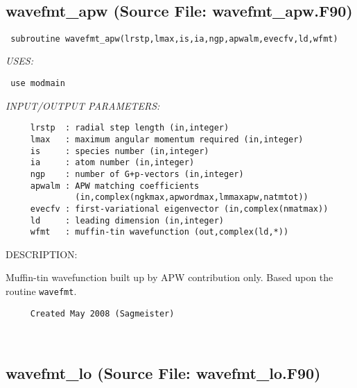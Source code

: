 \documentclass[11pt]{article}
\begin{document}



 
 
\mbox{}\hrulefill\ 
 
\subsection{wavefmt\_apw (Source File: wavefmt\_apw.F90)}


\begin{verbatim} subroutine wavefmt_apw(lrstp,lmax,is,ia,ngp,apwalm,evecfv,ld,wfmt)\end{verbatim}{\em USES:}
\begin{verbatim} use modmain\end{verbatim}{\em INPUT/OUTPUT PARAMETERS:}
\begin{verbatim}     lrstp  : radial step length (in,integer)
     lmax   : maximum angular momentum required (in,integer)
     is     : species number (in,integer)
     ia     : atom number (in,integer)
     ngp    : number of G+p-vectors (in,integer)
     apwalm : APW matching coefficients
              (in,complex(ngkmax,apwordmax,lmmaxapw,natmtot))
     evecfv : first-variational eigenvector (in,complex(nmatmax))
     ld     : leading dimension (in,integer)
     wfmt   : muffin-tin wavefunction (out,complex(ld,*))\end{verbatim}
{\sf DESCRIPTION:\\ }


     Muffin-tin wavefunction built up by APW contribution only.
     Based upon the routine {\tt wavefmt}.
  
\begin{verbatim}     Created May 2008 (Sagmeister)\end{verbatim}


 
 
\mbox{}\hrulefill\ 
 
\subsection{wavefmt\_lo (Source File: wavefmt\_lo.F90)}
\end{document}
